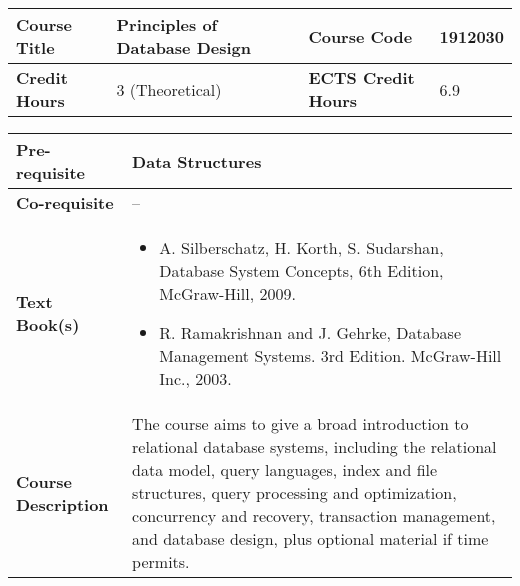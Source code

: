 \documentclass[12pt]{article}
\begin{document}
\bigskip
\bigskip



\begin{minipage}{\textwidth}
\begin{tabularx}{\textwidth}{|l|X|l|X|}
\hline
\textbf{Course Title}       &  Principles of Database Design & \textbf{Course Code}       &  1912030 \\ \hline
\textbf{Credit Hours}       &  3 (Theoretical) & \textbf{ECTS Credit Hours}       &   6.9 \\ \hline
\end{tabularx}

\begin{tabularx}{\textwidth}{|l|X|}
\hline
\textbf{Pre-requisite}      &  Data Structures \\ \hline
\textbf{Co-requisite}       &  -- \\ \hline
\textbf{Text Book(s)}      & \begin{minipage}{.70\textwidth}
					\begin{itemize} \itemsep-0.4em
						\vspace{3mm}
						\item  A. Silberschatz, H. Korth, S. Sudarshan, Database System Concepts, 6th Edition, McGraw-Hill, 2009. 
						\item R. Ramakrishnan and J. Gehrke, Database Management Systems. 3rd Edition. McGraw-Hill Inc., 2003.
						\vspace{3mm}
					\end{itemize}
				\end{minipage}  \\ \hline
\textbf{Course Description} & \begin{minipage}{.70\textwidth}
					\vspace{3mm}
					The course aims to give a broad introduction to relational database systems,
					including the relational data model, query languages, index and file structures, query processing and
					optimization, concurrency and recovery, transaction management, and database design, plus optional
					material if time permits. 

					\vspace{3mm}
					\end{minipage} \\ \hline
\end{tabularx}
\end{minipage}


\bigskip
\bigskip
\end{document}
